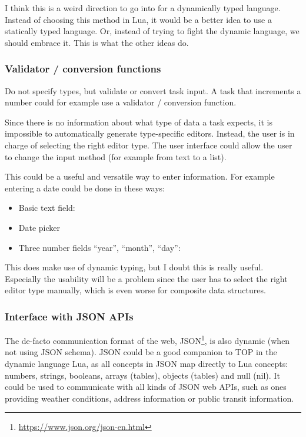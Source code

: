 I think this is a weird direction to go into for a dynamically typed language. Instead of choosing this method in Lua, it would be a better idea to use a statically typed language. Or, instead of trying to fight the dynamic language, we should embrace it. This is what the other ideas do.

\subsubsection{Validator / conversion functions}
Do not specify types, but validate or convert task input. A task that increments a number could for example use a  validator / conversion function.

Since there is no information about what type of data a task expects, it is impossible to automatically generate type-specific editors. Instead, the user is in charge of selecting the right editor type. The user interface could allow the user to change the input method (for example from text to a list).

This could be a useful and versatile way to enter information. For example entering a date could be done in these ways:
\begin{itemize}
    \item Basic text field: 
    \item Date picker
    \item Three number fields ``year'', ``month'', ``day'':\\
\end{itemize}

This does make use of dynamic typing, but I doubt this is really useful. Especially the usability will be a problem since the user has to select the right editor type manually, which is even worse for composite data structures.

\subsubsection{Interface with JSON APIs}
The de-facto communication format of the web, JSON\footnote{\url{https://www.json.org/json-en.html}}, is also dynamic (when not using JSON schema). JSON could be a good companion to TOP in the dynamic language Lua, as all concepts in JSON map directly to Lua concepts: numbers, strings, booleans, arrays (tables), objects (tables) and null (nil). It could be used to communicate with all kinds of JSON web APIs, such as ones providing weather conditions, address information or public transit information.

